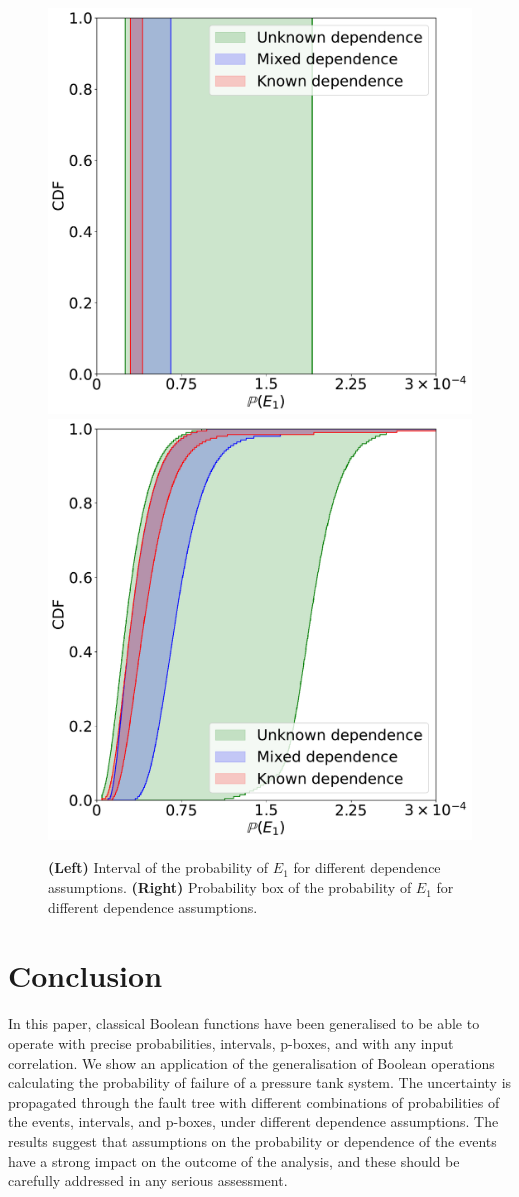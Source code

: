\documentclass[runningheads]{llncs}
\begin{document}
\begin{figure}[!ht]
    \centering
        \centering
        \includegraphics[width=0.5\linewidth]{figures/intervals.pdf}%
        \hfill
        \includegraphics[width=0.5\linewidth]{figures/mixed.pdf}
    \caption{\textbf{(Left)} Interval of the probability of $E_1$ for different dependence assumptions. \textbf{(Right)} Probability box of the probability of $E_1$ for different dependence assumptions.}
\end{figure}

\section{Conclusion}

In this paper, classical Boolean functions have been generalised to be able to operate with precise probabilities, intervals, p-boxes, and with any input correlation.
We show an application of the generalisation of Boolean operations calculating the probability of failure of a pressure tank system.
The uncertainty is propagated through the fault tree with different combinations of probabilities of the events, intervals, and p-boxes, under different dependence assumptions.
The results suggest that assumptions on the probability or dependence of the events have a strong impact on the outcome of the analysis, and these should
be carefully addressed in any serious assessment.
\end{document}
